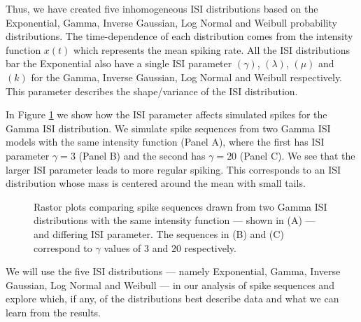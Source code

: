 \documentclass[../main.tex]{subfiles}
\begin{document}
 Thus, we have created five inhomogeneous ISI distributions based on the Exponential, Gamma, Inverse Gaussian, Log Normal and Weibull probability distributions. The time-dependence of each distribution comes from the intensity function $x(t)$ which represents the mean spiking rate. All the ISI distributions bar the Exponential also have a single ISI parameter $(\gamma)$, $(\lambda)$, $(\mu)$ and $(k)$ for the Gamma, Inverse Gaussian, Log Normal and Weibull respectively. This parameter describes the shape/variance of the ISI distribution. 
 
 In Figure \ref{fig:ISIParam} we show how the ISI parameter affects simulated spikes for the Gamma ISI distribution. We simulate spike sequences from two Gamma ISI models with the same intensity function (Panel A), where the first has ISI parameter $\gamma = 3$ (Panel B) and the second has $\gamma = 20$ (Panel C). We see that the larger ISI parameter leads to more regular spiking. This corresponds to an ISI distribution whose mass is centered around the mean with small tails. 
 
   \begin{figure}[t!]
   \hrulefill
   \begin{center} 
    \end{center}     
    \caption{Rastor plots comparing spike sequences drawn from two Gamma ISI distributions with the same intensity function ---  shown in (A) --- and differing ISI parameter. The sequences in  (B) and (C) correspond to $\gamma$ values of $3$ and $20$ respectively.}
    \label{fig:ISIParam}
    \hrulefill
    \end{figure}
 
 We will use the five ISI distributions --- namely Exponential, Gamma, Inverse Gaussian, Log Normal and Weibull  --- in our analysis of  spike sequences and explore which, if any, of the distributions best describe  data and what we can learn from the results.
\end{document}
